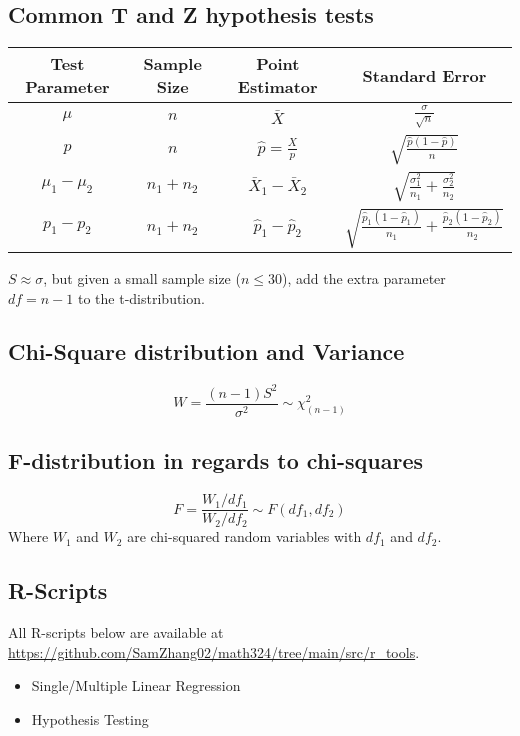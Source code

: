 \documentclass[sn-mathphys,Numbered]{sn-jnl}%
\begin{document}
\subsection*{Common T and Z hypothesis tests}
\bgroup
\begin{center}
    \def\arraystretch{2}
    \begin{tabular}{ c|c|c|c }
        \toprule
        Test Parameter  & Sample Size & Point Estimator        & Standard Error                                                               \\
        \midrule
        $\mu$           & $n$         & $\bar X$               & $\frac{\sigma}{\sqrt{n}}$                                                    \\
        $p$             & $n$         & $\hat p = \frac{X}{p}$ & $\sqrt{\frac{\hat p(1-\hat p)}{n}}$                                          \\
        $\mu_1 - \mu_2$ & $n_1 + n_2$ & $\bar X_1 - \bar X_2$  & $\sqrt{\frac{\sigma_1^2}{n_1} + \frac{\sigma_2^2}{n_2}}$                     \\
        $p_1 - p_2$     & $n_1 + n_2$ & $\hat p_1 - \hat p_2$  & $\sqrt{\frac{\hat p_1(1-\hat p_1)}{n_1} + \frac{\hat p_2(1-\hat p_2)}{n_2}}$ \\
        \bottomrule
    \end{tabular}
\end{center}
\egroup
$S\approx \sigma$, but given a small sample size ($n \le 30$), add the extra parameter $df = n-1$ to the t-distribution.

\subsection*{Chi-Square distribution and Variance}
\begin{equation}
    W = \frac{(n-1)S^2}{\sigma^2} \sim \chi^2_{(n-1)}
\end{equation}

\subsection*{F-distribution in regards to chi-squares}
\begin{equation}
    F = \frac{W_1/df_1}{W_2/df_2} \sim F(df_1, df_2)
\end{equation}
Where $W_1$ and $W_2$ are chi-squared random variables with $df_1$ and $df_2$.

\subsection*{R-Scripts}
All R-scripts below are available at
\url{https://github.com/SamZhang02/math324/tree/main/src/r_tools}.
\begin{itemize}
    \item Single/Multiple Linear Regression
    \item Hypothesis Testing
\end{itemize}
\end{document}
